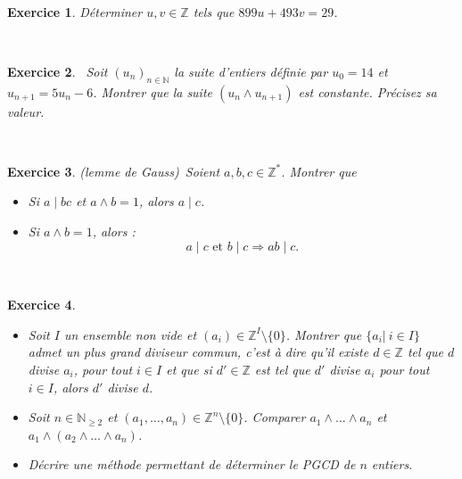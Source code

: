 \documentclass[11pt,a4paper]{article}
\newtheorem{ex}{Exercice}
\newcommand{\N}{\mathbb{N}}
\newcommand{\Z}{\mathbb{Z}}
\begin{document}
\



\begin{ex}\label{exEuclide_etendu_exemple}
Déterminer $u,v\in \Z$ tels que $899 u+493v=29$.
\end{ex}


\


\begin{ex}\label{exPGCD_suite}\
Soit $(u_n)_{n \in \mathbb{N}}$ la suite d'entiers définie par $u_0=14$ et $u_{n+1}=5 u_n -6$. Montrer que la suite $(u_n\wedge u_{n+1})$ est constante. Précisez sa valeur.
\end{ex}


\
\begin{ex}\label{exLemmeGauss}(lemme de Gauss)\
 Soient $a,b,c \in \mathbb{Z}^*$. Montrer que 
\begin{itemize}
\item[$1)$] Si $a\mid bc$ et $a \wedge b=1$, alors $a \mid c$.
\item[$2)$] Si $a \wedge b=1$, alors :\[a \mid c \text{ et }b \mid c  \Rightarrow ab \mid c.\] 
\end{itemize}
\end{ex}


\



\begin{ex}\label{exPGCD_famille}\
\begin{itemize}
\item[$1$.] Soit $I$ un ensemble non vide et $(a_i)\in \Z^I\setminus\{0\}$. Montrer que $\{a_i|\ i\in I\}$ admet un plus grand diviseur commun, c'est à dire qu'il existe $d\in \Z$ tel que $d$ divise $a_i$, pour tout $i\in I$ et que si $d'\in \Z$ est tel que $d'$ divise $a_i$ pour tout $i\in I$, alors $d'$ divise $d$.

\item[$2.$] Soit $n\in \N_{\geq 2}$ et $(a_1,\ldots,a_n)\in \Z^n\setminus\{0\}$. Comparer $a_1\wedge\ldots \wedge a_n$ et $a_1\wedge (a_2\wedge \ldots \wedge a_n)$.

\item[$3.$] Décrire une méthode permettant de déterminer le PGCD de $n$ entiers. 

\end{itemize}

\end{ex}




\
\end{document}

